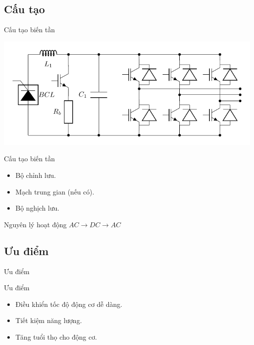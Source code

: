 \documentclass[24pt]{beamer}
\begin{document}
\subsection*{Cấu tạo}
\begin{frame}{Cấu tạo biến tần}
	\vspace{-2cm}
	\begin{flushleft}
		\includegraphics[scale=1]{images-chude3/bientan.pdf}
	\end{flushleft}
\end{frame}

\begin{frame}{Cấu tạo biến tần}
	\begin{itemize}
		\item Bộ chỉnh lưu.
		\item Mạch trung gian (nếu có).
		\item Bộ nghịch lưu.
	\end{itemize}
	\begin{block}{Nguyên lý hoạt động}
		$AC \longrightarrow DC \longrightarrow AC$
	\end{block}
\end{frame}

\subsection*{Ưu điểm}
\begin{frame}{Ưu điểm}
	\begin{block}{Ưu điểm}
		\begin{itemize}	
		\justifying
			\item Điều khiển tốc độ động cơ dễ dàng.
			\item Tiết kiệm năng lượng.
			\item Tăng tuổi thọ cho động cơ.
		\end{itemize}
	\end{block}
\end{frame}


\end{document}
